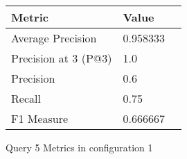 \begin{figure}[H]
\begin{center}
\begin{tabular}{lll}
\toprule
{}                      Metric &         Value \\
\midrule
     Average Precision &  0.958333 \\
  Precision at 3 (P@3) &       1.0 \\
             Precision &       0.6 \\
                Recall &      0.75 \\
            F1 Measure &  0.666667 \\
\bottomrule
\end{tabular}
\end{center}
\caption{Query 5 Metrics in configuration 1}
\label{fig:query_5_metrics_config_1}
\end{figure}